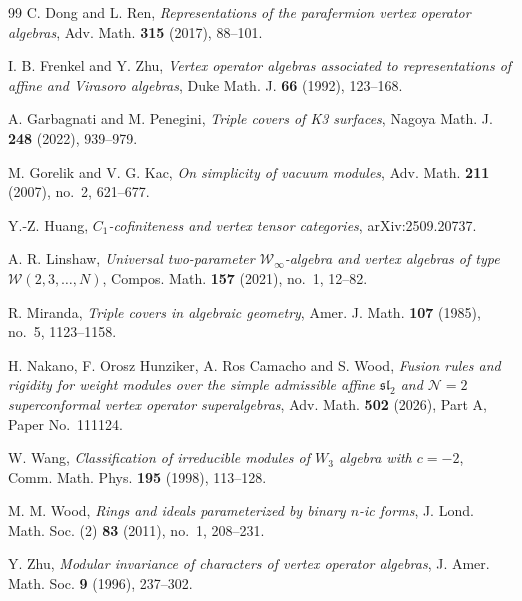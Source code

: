 \documentclass[11 pt]{amsart}
\theoremstyle{definition}
\theoremstyle{plain}
\begin{document}
\begin{thebibliography}{99}
C. Dong and L. Ren,
\emph{Representations of the parafermion vertex operator algebras},
Adv. Math. \textbf{315} (2017), 88--101.


I. B. Frenkel and Y. Zhu,
\emph{Vertex operator algebras associated to representations of affine and Virasoro algebras},
Duke Math. J. \textbf{66} (1992), 123--168.

A. Garbagnati and M. Penegini,
\emph{Triple covers of K3 surfaces},
Nagoya Math. J. \textbf{248} (2022), 939--979.

M. Gorelik and V. G. Kac,
\emph{On simplicity of vacuum modules},
Adv. Math. \textbf{211} (2007), no.~2, 621--677.

Y.-Z. Huang,
\emph{$C_1$-cofiniteness and vertex tensor categories},
arXiv:2509.20737.

A. R. Linshaw,
\emph{Universal two-parameter $\mathcal W_\infty$-algebra and vertex algebras
of type $\mathcal W(2,3,\ldots,N)$},
Compos. Math. \textbf{157} (2021), no.~1, 12--82.

R. Miranda,
\emph{Triple covers in algebraic geometry},
Amer. J. Math. \textbf{107} (1985), no.~5, 1123--1158.


H. Nakano, F. Orosz Hunziker, A. Ros Camacho and S. Wood,
\emph{Fusion rules and rigidity for weight modules over the simple
admissible affine $\mathfrak{sl}_2$ and $\mathcal N=2$
superconformal vertex operator superalgebras},
Adv. Math. \textbf{502} (2026), Part A,
Paper No.~111124.

W. Wang,
\emph{Classification of irreducible modules of $W_3$ algebra with
$c=-2$},
Comm. Math. Phys. \textbf{195} (1998), 113--128.



M. M. Wood,
\emph{Rings and ideals parameterized by binary $n$-ic forms},
J. Lond. Math. Soc. (2) \textbf{83} (2011), no.~1, 208--231.

Y. Zhu,
\emph{Modular invariance of characters of vertex operator algebras},
J. Amer. Math. Soc. \textbf{9} (1996), 237--302.

\end{thebibliography}
\end{document}
